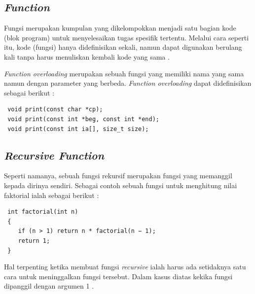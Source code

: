 \documentclass[../main.tex]{subfiles}
\begin{document}
    \subsection{\textit{Function}}
    Fungsi merupakan kumpulan {\statement} yang dikelompokkan menjadi satu bagian kode (blok program) untuk menyelesaikan tugas spesifik tertentu. Melalui cara seperti itu, kode (fungsi) hanya didefinisikan sekali, namun dapat digunakan berulang kali tanpa harus menuliskan kembali kode yang sama \parencite{raharjo2015pemrograman}.

    \textit{Function overloading} merupakan sebuah fungsi yang memiliki nama yang sama namun dengan parameter yang berbeda. \textit{Function overloading} dapat didefinisikan sebagai berikut \parencite{Lippman_Lajoie_Moo_2013}:
\begin{lstlisting}
 void print(const char *cp);
 void print(const int *beg, const int *end);
 void print(const int ia[], size_t size);
\end{lstlisting}

    \subsection{\textit{Recursive Function}}
    Seperti namanya, sebuah fungsi rekursif merupakan fungsi yang memanggil kepada dirinya sendiri. Sebagai contoh sebuah fungsi untuk menghitung nilai faktorial ialah sebagai berikut \parencite{grimes2017beginning}:

\begin{lstlisting}
 int factorial(int n)
 {
    if (n > 1) return n * factorial(n − 1);
    return 1;
 }
\end{lstlisting}

    Hal terpenting ketika membuat fungsi \textit{recursive} ialah harus ada setidaknya satu cara untuk meninggalkan fungsi tersebut. Dalam kasus diatas kekika fungsi  dipanggil dengan argumen 1 \parencite{grimes2017beginning}.
\end{document}
